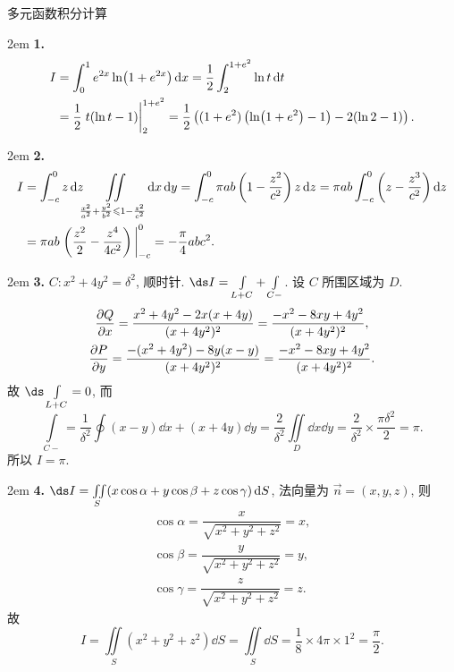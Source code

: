 \documentclass[UTF8,14pt,normal]{ctexart}
\begin{document}
\clearpage

 多元函数积分计算

    \hangindent 2em
    \noindent
    \textbf{1.}
    \begin{align*}
        I & = \int_0^1 e^{2x} \ln (1 + e^{2x}) \dd{x} = \dfrac{1}{2} \int_2^{1+e^2} \ln t \dd{t} \\
        & = \dfrac{1}{2} \eval{t(\ln t - 1)}_2^{1+e^2} = \dfrac{1}{2} \left((1+e^2)\left(\ln(1+e^2) - 1\right) - 2(\ln 2 - 1)\right).
    \end{align*}

    \hangindent 2em
    \noindent
    \textbf{2.}
    \begin{align*}
        I & = \int_{-c}^0 z \dd{z} \iint\limits_{\frac{x^2}{a^2} + \frac{y^2}{b^2} \leqslant 1 - \frac{z^2}{c^2}} \dd{x} \dd{y} = \int_{-c}^0 \pi ab \left(1 - \dfrac{z^2}{c^2}\right)z \dd{z} = \pi ab \int_{-c}^0 \left(z - \dfrac{z^3}{c^2}\right) \dd{z} \\
        & = \pi ab \eval{\left(\dfrac{z^2}{2} - \dfrac{z^4}{4c^2}\right)}_{-c}^0 = -\dfrac{\pi}{4} ab c^2.
    \end{align*}

    \hangindent 2em
    \noindent
    \textbf{3.} \(C \colon x^2 + 4y^2 = \delta^2\), 顺时针. \(\ds I = \int\limits_{L + C} + \int\limits_{C-} \). 设 \(C\) 所围区域为 \(D\).
    \begin{gather*}
        \pdv{Q}{x} = \dfrac{x^2 + 4y^2 -2x(x + 4y)}{(x + 4y^2)^2} = \dfrac{-x^2 - 8xy + 4y^2}{(x + 4y^2)^2}, \\
        \pdv{P}{y} = \dfrac{-(x^2 + 4y^2) - 8y(x - y)}{(x + 4y^2)^2} = \dfrac{-x^2 - 8xy + 4y^2}{(x + 4y^2)^2}.
    \end{gather*}
    故 \(\ds \int\limits_{L + C} = 0\), 而 \[
        \int\limits_{C-} = \frac{1}{\delta^2} \oint (x - y)\dd{x} + (x + 4y)\dd{y} = \frac{2}{\delta^2} \iint\limits_D \dd{x} \dd{y} = \frac{2}{\delta^2} \times \frac{\pi \delta^2}{2} = \pi.
        \]
    所以 \(I = \pi\).

    \hangindent 2em
    \noindent
    \textbf{4.} \(\ds I = \iint\limits_S (x \cos \alpha + y \cos \beta + z \cos \gamma) \dd{S}\), 法向量为 \(\vec{n} = (x, y, z)\), 则
    \begin{gather*}
        \cos \alpha = \dfrac{x}{\sqrt{x^2 + y^2 + z^2}} = x, \\ \cos \beta = \dfrac{y}{\sqrt{x^2 + y^2 + z^2}} = y, \\ \cos \gamma = \dfrac{z}{\sqrt{x^2 + y^2 + z^2}} = z.
    \end{gather*}
    故
    \[
        I = \iint\limits_S (x^2 + y^2 + z^2) \dd{S} = \iint\limits_S \dd{S} = \dfrac{1}{8} \times 4\pi \times 1^2 = \dfrac{\pi}{2}.
    \]
\end{document}
